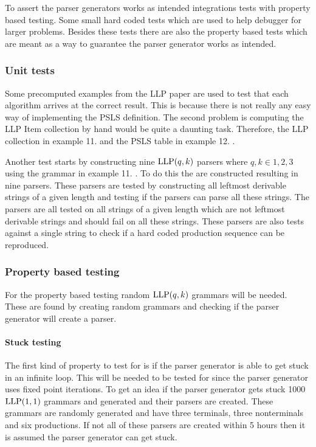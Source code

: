To assert the parser generators works as intended integrations tests with property based testing. Some small hard coded tests which are used to help debugger for larger problems. Besides these tests there are also the property based tests which are meant as a way to guarantee the parser generator works as intended.

\subsubsection{Unit tests}
Some precomputed examples from the LLP paper \cite{Vagner2007} are used to test that each algorithm arrives at the correct result. This is because there is not really any easy way of implementing the PSLS definition. The second problem is computing the LLP Item collection by hand would be quite a daunting task. Therefore, the LLP collection in example 11. \cite[14]{Vagner2007} and the PSLS table in example 12. \cite[14]{Vagner2007}.

Another test starts by constructing nine $\text{LLP}(q, k)$ parsers where $q, k \in {1, 2, 3}$ using the grammar in example 11. \cite[14]{Vagner2007}. To do this the are constructed resulting in nine parsers. These parsers are tested by constructing all leftmost derivable strings of a given length and testing if the parsers can parse all these strings. The parsers are all tested on all strings of a given length which are not leftmost derivable strings and should fail on all these strings. These parsers are also tests against a single string to check if a hard coded production sequence can be reproduced.

\subsubsection{Property based testing}
For the property based testing random $\text{LLP}(q,k)$ grammars will be needed. These are found by creating random grammars and checking if the parser generator will create a parser.

\paragraph{Stuck testing}
The first kind of property to test for is if the parser generator is able to get stuck in an infinite loop. This will be needed to be tested for since the parser generator uses fixed point iterations. To get an idea if the parser generator gets stuck 1000 $\text{LLP}(1, 1)$ grammars and generated and their parsers are created. These grammars are randomly generated and have three terminals, three nonterminals and six productions. If not all of these parsers are created within 5 hours then it is assumed the parser generator can get stuck.

